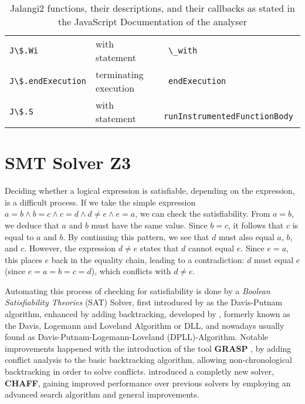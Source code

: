 \begin{table}[t]
{\begin{tabular}{l|l|l}
		{\lstinline|J\$.Wi          |} & with statement                                        &\lstinline| \_with                      |            \\
		{\lstinline|J\$.endExecution|} & terminating execution                                 &\lstinline| endExecution                |            \\
		{\lstinline|J\$.S           |} & with statement                                        &\lstinline| runInstrumentedFunctionBody |            \\
	\end{tabular}}
	\caption[List of Jalangi2 functions]{Jalangi2  functions, their descriptions, and their callbacks as stated in the JavaScript Documentation of the analyser}
	\label{tab:jal-fun}
\end{table}

\section{SMT Solver Z3}
\label{sec:z3}

Deciding whether a logical expression is satisfiable, depending on the expression, is a difficult process.
If we take the simple expression $a = b \land b= c\land c = d \land d \neq e \land e = a$, we can check the satisfiability.
From $a = b$, we deduce that $a$ and $b$ must have the same value. 
Since $b = c$, it follows that $c$ is equal to $a$ and $b$. 
By continuing this pattern, we see that $d$ must also equal $a$, $b$, and $c$. 
However, the expression $d \neq e$ states that $d$ cannot equal $e$. Since $e = a$, this places $e$ back in the equality chain, leading to a contradiction: $d$ must equal $e$ (since $e = a = b = c = d$), which conflicts with $d \neq e$.

Automating this process of checking for satisfiability is done by a \textit{Boolean Satisfiability Theories} (SAT) Solver, first introduced by  \citet{davis_computing_1960} as the Davis-Putnam algorithm, enhanced by adding backtracking, developed by \citet{davis_machine_1962}, formerly known as the Davis, Logemann and Loveland Algorithm or DLL, and nowadays usually found as Davis-Putnam-Logemann-Loveland (DPLL)-Algorithm. Notable improvements happened with the introduction of the tool \textbf{GRASP} \cite{silva_grasp_1996}, by adding conflict analysis to the basic backtracking algorithm, allowing non-chronological backtracking in order to solve conflicts. \citet{moskewicz_chaff_2001} introduced a completly new solver, \textbf{CHAFF}, gaining improved performance over previous solvers by employing an advanced search algorithm and general improvements.

